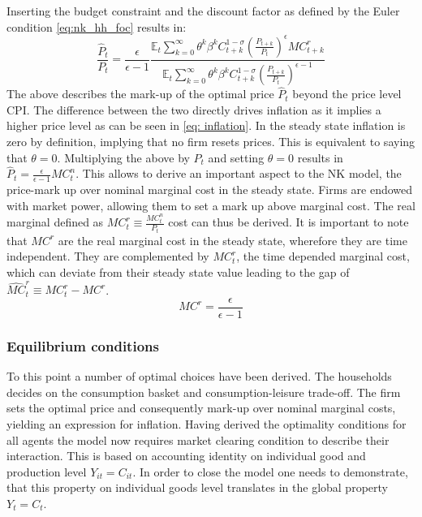 \documentclass[12pt,a4paper,english]{article} %
\newcommand{\E}{\mathbb{E}} %
\begin{document}
	Inserting the budget constraint and the discount factor as defined by the Euler condition \eqref{eq:nk_hh_foc} results in:
	\begin{equation}
		\frac{\hat{P}_t}{P_t} = \frac{\epsilon}{\epsilon-1} 
		\frac{
		\E_t \sum_{k=0}^{\infty} \theta^k \beta^k C_{t+k}^{1-\sigma} (\frac{P_{t+k}}{P_t})^\epsilon MC_{t+k}^r
		}{
		\E_t \sum_{k=0}^{\infty} \theta^k \beta^k C_{t+k}^{1-\sigma} (\frac{P_{t+k}}{P_t})^{\epsilon-1}
		}
	\end{equation}
	The above describes the mark-up of the optimal price $\hat{P}_t$ beyond the price level CPI. The difference between the two directly drives inflation as it implies a higher price level as can be seen in \eqref{eq: inflation}. 
	In the steady state inflation is zero by definition, implying that no firm resets prices. This is equivalent to saying that $\theta=0$. Multiplying the above by $P_t$ and setting $\theta=0$ results in $\hat{P}_t = \frac{\epsilon}{\epsilon-1} MC_t^n$. This allows to derive an important aspect to the NK model, the price-mark up over nominal marginal cost in the steady state. Firms are endowed with market power, allowing them to set a mark up above marginal cost. The real marginal defined as $MC_t^r \equiv \frac{MC_t^n}{P_t}$ cost can thus be derived. It is important to note that $MC^r$ are the real marginal cost in the steady state, wherefore they are time independent. They are complemented by $MC_t^r$, the time depended marginal cost, which can deviate from their steady state value leading to the gap of $\hat{MC}_t^r \equiv MC_t^r - MC^r$.
	\begin{equation}
		MC^r = \frac{\epsilon}{\epsilon-1}
	\end{equation} 
	
	\subsubsection{Equilibrium conditions}
	To this point a number of optimal choices have been derived. The households decides on the consumption basket and consumption-leisure trade-off. The firm sets the optimal price and consequently mark-up over nominal marginal costs, yielding an expression for inflation. Having derived the optimality conditions for all agents the model now requires market clearing condition to describe their interaction. This is based on accounting identity on individual good and production level $Y_{it} = C_{it}$. In order to close the model one needs to demonstrate, that this property on individual goods level translates in the global property $Y_t = C_t$.
	
\end{document}
